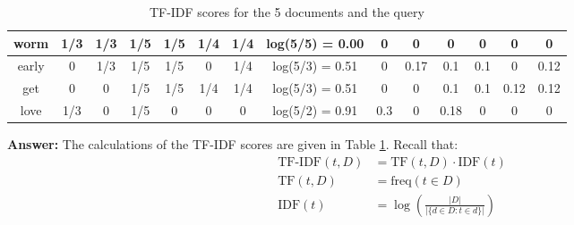 \documentclass{article}
\newenvironment{QandA}{\begin{enumerate}[label=\arabic*.]}{\end{enumerate}}
\newenvironment{InnerQandA}{\begin{enumerate}[label=\roman*.]}{\end{enumerate}}
\newenvironment{answer}{\par\normalfont \textbf{Answer:}}{}
\begin{document}
\begin{QandA}
\begin{InnerQandA}
\begin{table}[h!]
\begin{tabular}{|c|cccccc|c|cccccc|}
            worm              & \multicolumn{1}{c|}{1/3} & \multicolumn{1}{c|}{1/3} & \multicolumn{1}{c|}{1/5} & \multicolumn{1}{c|}{1/5} & \multicolumn{1}{c|}{1/4} & 1/4 & log(5/5) = 0.00         & \multicolumn{1}{c|}{0}    & \multicolumn{1}{c|}{0}    & \multicolumn{1}{c|}{0}    & \multicolumn{1}{c|}{0}    & \multicolumn{1}{c|}{0}    & 0    \\ \hline
            early             & \multicolumn{1}{c|}{0}   & \multicolumn{1}{c|}{1/3} & \multicolumn{1}{c|}{1/5} & \multicolumn{1}{c|}{1/5} & \multicolumn{1}{c|}{0}   & 1/4 & log(5/3) = 0.51      & \multicolumn{1}{c|}{0}    & \multicolumn{1}{c|}{0.17} & \multicolumn{1}{c|}{0.1}  & \multicolumn{1}{c|}{0.1}  & \multicolumn{1}{c|}{0}    & 0.12 \\ \hline
            get               & \multicolumn{1}{c|}{0}   & \multicolumn{1}{c|}{0}   & \multicolumn{1}{c|}{1/5} & \multicolumn{1}{c|}{1/5} & \multicolumn{1}{c|}{1/4} & 1/4 & log(5/3) = 0.51      & \multicolumn{1}{c|}{0}    & \multicolumn{1}{c|}{0}    & \multicolumn{1}{c|}{0.1}  & \multicolumn{1}{c|}{0.1}  & \multicolumn{1}{c|}{0.12} & 0.12 \\ \hline
            love              & \multicolumn{1}{c|}{1/3} & \multicolumn{1}{c|}{0}   & \multicolumn{1}{c|}{1/5}  & \multicolumn{1}{c|}{0}   & \multicolumn{1}{c|}{0}   & 0   & log(5/2) = 0.91      & \multicolumn{1}{c|}{0.3}  & \multicolumn{1}{c|}{0}    & \multicolumn{1}{c|}{0.18} & \multicolumn{1}{c|}{0}    & \multicolumn{1}{c|}{0}    & 0    \\ \hline
            \end{tabular}
            \caption{TF-IDF scores for the 5 documents and the query}
            \label{tab:tf-idf-1}
            \end{table}
        \begin{answer}
            The calculations of the TF-IDF scores are given in Table \ref{tab:tf-idf-1}. Recall that:
            \begin{align*}
                \text{TF-IDF}(t, D) &= \text{TF}(t, D) \cdot \text{IDF}(t) \\
                \text{TF}(t, D) &= \text{freq}(t \in D) \\
                \text{IDF}(t) &= \log \left( \frac{\vert D \vert}{\vert \{ d \in D: t \in d \}\vert}\right)
            \end{align*}
            

\end{answer}
\end{InnerQandA}
\end{QandA}
\end{document}
